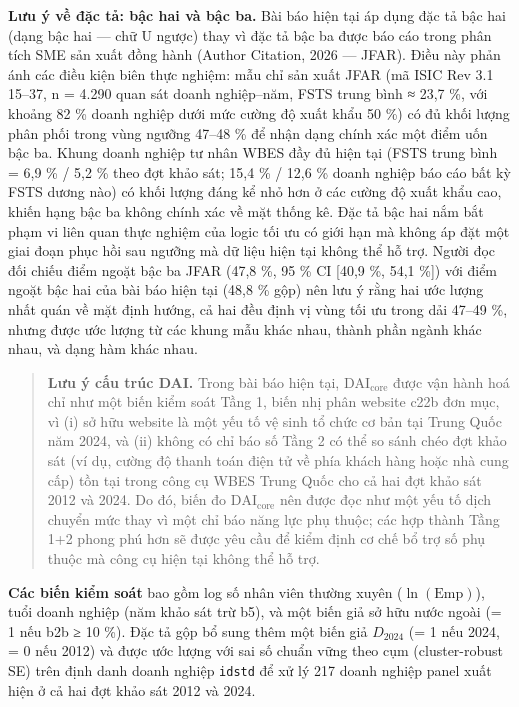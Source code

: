 \documentclass[12pt,a4paper]{article}
\begin{document}
\textbf{Lưu ý về đặc tả: bậc hai và bậc ba.} Bài báo hiện tại áp dụng
đặc tả bậc hai (dạng bậc hai --- chữ U ngược) thay vì đặc tả bậc ba được
báo cáo trong phân tích SME sản xuất đồng hành (Author Citation, 2026
--- JFAR). Điều này phản ánh các điều kiện biên thực nghiệm: mẫu chỉ sản
xuất JFAR (mã ISIC Rev 3.1 15--37, n = 4.290 quan sát doanh nghiệp--năm,
FSTS trung bình ≈ 23,7 \%, với khoảng 82 \% doanh nghiệp dưới mức cường
độ xuất khẩu 50 \%) có đủ khối lượng phân phối trong vùng ngưỡng 47--48
\% để nhận dạng chính xác một điểm uốn bậc ba. Khung doanh nghiệp tư
nhân WBES đầy đủ hiện tại (FSTS trung bình = 6,9 \% / 5,2 \% theo đợt
khảo sát; 15,4 \% / 12,6 \% doanh nghiệp báo cáo bất kỳ FSTS dương nào)
có khối lượng đáng kể nhỏ hơn ở các cường độ xuất khẩu cao, khiến hạng
bậc ba không chính xác về mặt thống kê. Đặc tả bậc hai nắm bắt phạm vi
liên quan thực nghiệm của logic tối ưu có giới hạn mà không áp đặt một
giai đoạn phục hồi sau ngưỡng mà dữ liệu hiện tại không thể hỗ trợ.
Người đọc đối chiếu điểm ngoặt bậc ba JFAR (47,8 \%, 95 \% CI {[}40,9
\%, 54,1 \%{]}) với điểm ngoặt bậc hai của bài báo hiện tại (48,8 \%
gộp) nên lưu ý rằng hai ước lượng nhất quán về mặt định hướng, cả hai
đều định vị vùng tối ưu trong dải 47--49 \%, nhưng được ước lượng từ các
khung mẫu khác nhau, thành phần ngành khác nhau, và dạng hàm khác nhau.

\begin{quote}
\textbf{Lưu ý cấu trúc DAI.} Trong bài báo hiện tại,
\(\mathrm{DAI}_{\text{core}}\) được vận hành hoá chỉ như một biến kiểm
soát Tầng 1, biến nhị phân website c22b đơn mục, vì (i) sở hữu website
là một yếu tố vệ sinh tổ chức cơ bản tại Trung Quốc năm 2024, và (ii)
không có chỉ báo số Tầng 2 có thể so sánh chéo đợt khảo sát (ví dụ,
cường độ thanh toán điện tử về phía khách hàng hoặc nhà cung cấp) tồn
tại trong công cụ WBES Trung Quốc cho cả hai đợt khảo sát 2012 và 2024.
Do đó, biến đo \(\mathrm{DAI}_{\text{core}}\) nên được đọc như một yếu
tố dịch chuyển mức thay vì một chỉ báo năng lực phụ thuộc; các hợp thành
Tầng 1+2 phong phú hơn sẽ được yêu cầu để kiểm định cơ chế bổ trợ số phụ
thuộc mà công cụ hiện tại không thể hỗ trợ.
\end{quote}

\textbf{Các biến kiểm soát} bao gồm log số nhân viên thường xuyên
(\(\ln(\mathrm{Emp})\)), tuổi doanh nghiệp (năm khảo sát trừ b5), và một
biến giả sở hữu nước ngoài (= 1 nếu b2b ≥ 10 \%). Đặc tả gộp bổ sung
thêm một biến giả \(D_{2024}\) (= 1 nếu 2024, = 0 nếu 2012) và được ước
lượng với sai số chuẩn vững theo cụm (cluster-robust SE) trên định danh
doanh nghiệp \texttt{idstd} để xử lý 217 doanh nghiệp panel xuất hiện ở
cả hai đợt khảo sát 2012 và 2024.
\end{document}
